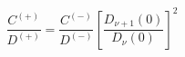 \begin{equation}
\frac{C^{\left( +\right) }}{D^{\left( +\right) }}=\frac{C^{\left( -\right) }%
}{D^{\left( -\right) }}\left[ \frac{D_{\nu +1}\left( 0\right) }{D_{\nu
}\left( 0\right) }\right] ^{2}  \label{22b}
\end{equation}

